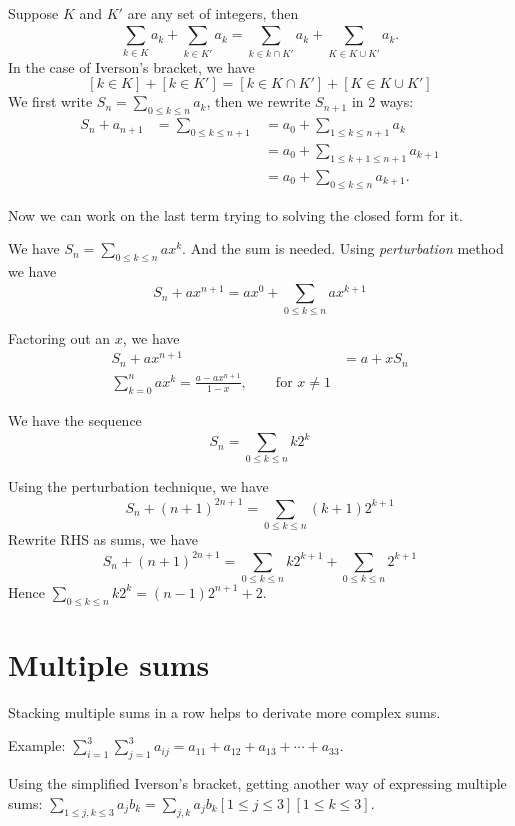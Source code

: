 Suppose $K$ and $K'$ are any set of integers, then 
\[
    \sum_{k \in K}^{}a_k + \sum_{k\in K'}^{}a_k = \sum_{k\in k \cap K'}^{}a_k +
    \sum_{K\in K \cup K'}^{}a_k.
\]
In the case of Iverson's bracket, we have 
\[
    [k\in K]+[k\in K'] = [k \in K \cap K'] + [K \in K \cup K']
\]
 We first write $S_n = \sum_{0 \leq k \leq n}^{}a_k$,
then we rewrite $S_{n+1}$ in 2 ways: 
\begin{align*}
    S_n +a_{n+1} &= \sum_{0 \leq k \leq n+1}^{} &= a_0 + \sum_{1\leq k\leq n+1}^{}a_k  \\
                 & &= a_0 + \sum_{1\leq k+1 \leq n+1}^{}a_{k+1}\\
                 & &= a_0 + \sum_{0 \leq k \leq n}^{}a_{k+1}.
\end{align*}

Now we can work on the last term trying to solving the closed form for it. 

 We have $S_n = \sum_{0 \leq k \leq
n}^{}ax^k$. And the sum is needed. Using {\it perturbation} method we have 
\[
    S_n + ax^{n+1} = ax^0 + \sum_{0\leq k\leq n}^{}ax^{k+1}
\]

Factoring out an $x$, we have
\begin{align*}
    S_n + ax^{n+1} &= a + xS_n \\
    \sum_{k=0}^{n} ax^k = \frac{a-ax^{n+1}}{1-x}, \qquad \text{for } x \neq 1
\end{align*}

 We have the sequence 
\[
    S_n = \sum_{0 \leq k \leq n}^{}k 2^k
\]

Using the perturbation technique, we have 
\[
    S_n + (n+1)^{2n+1} = \sum_{0\leq k\leq n}^{}(k+1)2^{k+1}
\]
Rewrite RHS as sums, we have 
\[
    S_n + (n+1)^{2n+1} = \sum_{0\leq k\leq n}^{}k 2^{k+1} + 
    \sum_{0\leq k\leq n}^{}2^{k+1}
\]
Hence $\sum_{0\leq k\leq n}^{}k 2^k = (n-1)2^{n+1}+2$.

\section{Multiple sums}

 Stacking multiple sums in a row helps to derivate more
complex sums. 

Example: $\sum_{i=1}^{3}\sum_{j=1}^{3}a_{ij} = a_{11}+a_{12}+a_{13}+\cdots
+a_{33}$.

Using the simplified Iverson's bracket, getting another way of expressing
multiple sums: $\sum_{1\leq j,k\leq 3}^{}a_j b_k = \sum_{j,k}^{}a_jb_k[1\leq
j\leq 3] [1\leq k\leq 3]$. 

